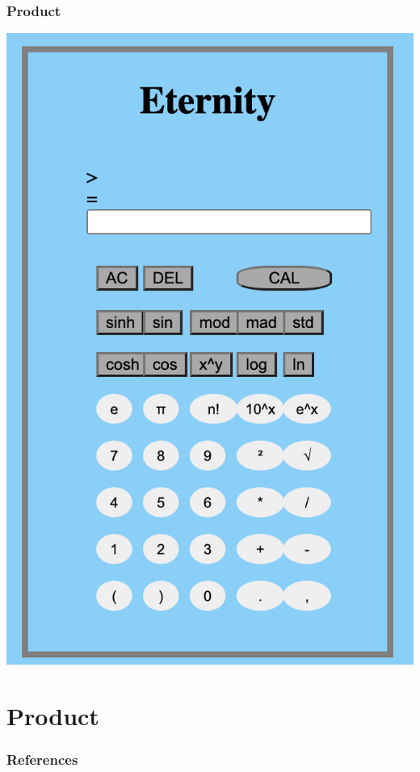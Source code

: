 \documentclass{beamer}
\begin{document}
\begin{frame}
\frametitle{Product}
\centering
\includegraphics[scale = 0.4]{Calculator}
\end{frame}

\section{Product}
\begin{frame}
\frametitle{References}
\end{frame}
\end{document}
